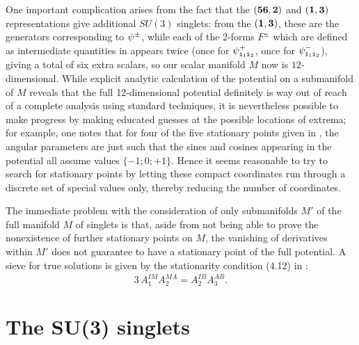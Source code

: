 \documentclass[a4paper,12pt]{article}
\begin{document}
One important complication arises from the fact that the $({\bf 56},{\bf 2})$ and
$({\bf 1},{\bf 3})$ representations give additional $SU(3)$ singlets: from the
$({\bf 1},{\bf 3})$, these are the generators corresponding to $\psi^\pm_{}$, while
each of the 2-forms $F^\pm$ which are defined as intermediate
quantities in \cite{Warner:vz} appears twice (once for $\psi^+_{{\tt
i}_1{\tt i}_2}$, once for $\psi^-_{{\tt i}_1{\tt i}_2}$), giving a total
of six extra scalars, so our scalar manifold $M$ now is
$12$-dimensional. While explicit analytic calculation of the potential
on a submanifold of $M$ reveals that the full 12-dimensional potential
definitely is way out of reach of a complete analysis using standard
techniques, it is nevertheless possible to make progress by making
educated guesses at the possible locations of extrema; for example,
one notes that for four of the five stationary points given in
\cite{Warner:vz}, the angular parameters are just such that the sines
and cosines appearing in the potential all assume values
$\{-1;0;+1\}$. Hence it seems reasonable to try to search for
stationary points by letting these compact coordinates run through a
discrete set of special values only, thereby reducing the number of
coordinates.

The immediate problem with the consideration of only submanifolds $M'$
of the full manifold $M$ of singlets is that, aside from not being
able to prove the nonexistence of further stationary points on $M$,
the vanishing of derivatives within $M'$ does not guarantee to have a
stationary point of the full potential. A sieve for true solutions is
given by the stationarity condition (4.12) in \cite{Nicolai:2001sv}:
%
\begin{equation}
\label{SolutionSieve}
3\,A_1^{IM}A_2^{M\dot A}=A_2^{I\dot B}A_3^{\dot A\dot B}.
\end{equation}

\vfill

\section{The SU(3) singlets}
\end{document}
